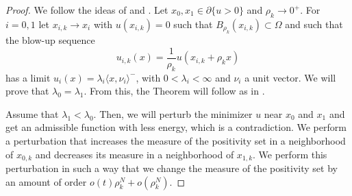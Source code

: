 \documentclass[11pt]{amsart}
\theoremstyle{definition}
\theoremstyle{remark}
\numberwithin{equation}{section}
\begin{document}
\begin{proof}
We follow the ideas of \cite[Theorem~3]{AAC} and \cite[Theorem~5.1 and Lemma~5.2]{Le2}. Let $x_0,x_1\in\partial\{u>0\}$ and $\rho_k\to0^+$. For $i=0,1$ let $x_{i,k}\to x_i$ with $u(x_{i,k})=0$ such that $B_{\rho_k}(x_{i,k})\subset\Omega$ and such that the blow-up sequence
\[
u_{i,k}(x)=\frac1{\rho_k}u(x_{i,k}+\rho_kx)
\]
has a limit $u_i(x)=\lambda_i\langle x,\nu_i\rangle^-$, with $0<\lambda_i<\infty$ and $\nu_i$ a unit vector. We will prove that $\lambda_0=\lambda_1$. From this, the Theorem will follow as in \cite{Le2}.

Assume that $\lambda_1<\lambda_0$. Then, we will perturb the minimizer $u$ near $x_0$ and $x_1$ and get an admissible function with less energy, which is a contradiction. We perform a perturbation that increases the measure of the positivity set in a neighborhood of $x_{0,k}$ and decreases its measure in a neighborhood of $x_{1,k}$. We perform this perturbation in such a way that we change the measure of the positivity set by an amount of order $o(t)\rho_k^N+o(\rho_k^N)$.


\end{proof}
\end{document}
